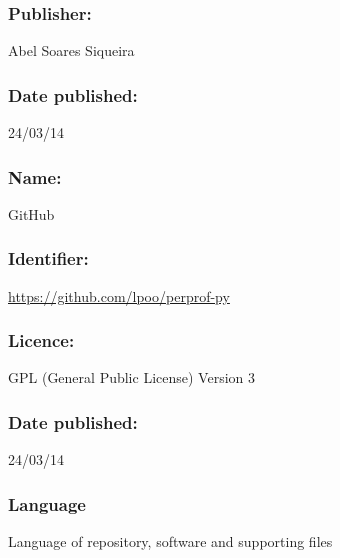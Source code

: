     \subsubsection*{Publisher:} Abel Soares Siqueira

    \subsubsection*{Date published:} 24/03/14

\CodeRepository

    \subsubsection*{Name:} GitHub

    \subsubsection*{Identifier:} \url{https://github.com/lpoo/perprof-py}

    \subsubsection*{Licence:} GPL (General Public License) Version 3

    \subsubsection*{Date published:} 24/03/14

\subsubsection*{Language}

    Language of repository, software and supporting files

